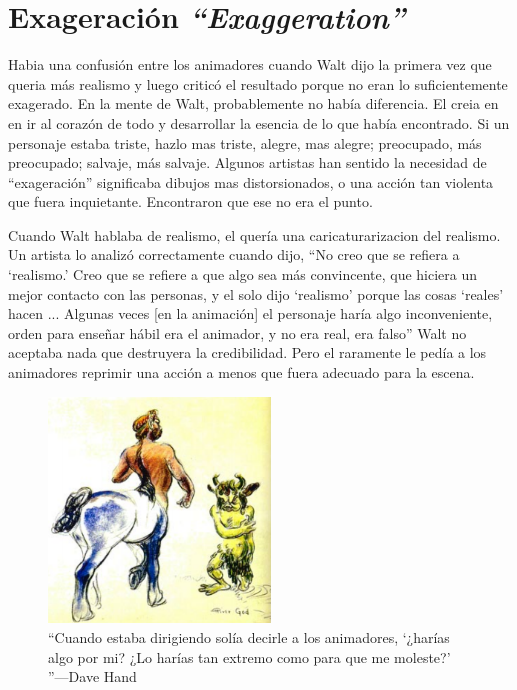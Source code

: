 \documentclass[a4paper,12pt]{report}
\begin{document}
 
 
\section{Exageración \textit{``Exaggeration''}}
 
 
Habia una confusión entre los animadores cuando Walt dijo la primera vez que queria más realismo y luego criticó el resultado porque no eran lo suficientemente exagerado.
En la mente de Walt, probablemente no había diferencia. El creia en en ir al corazón de todo y desarrollar la esencia de lo que había encontrado.
Si un personaje estaba triste, hazlo mas triste, alegre, mas alegre; preocupado, más preocupado; salvaje, más salvaje.
Algunos artistas han sentido la necesidad de ``exageración'' significaba dibujos mas distorsionados, o una acción tan violenta que fuera inquietante.
Encontraron que ese no era el punto.\cite{principles_animation}
 
 
Cuando Walt hablaba de realismo, el quería una caricaturarizacion del realismo. Un artista lo analizó correctamente cuando dijo,
``No creo que se refiera a `realismo.' Creo que se refiere a que algo sea más convincente, que hiciera un mejor contacto con las personas, y el solo
dijo `realismo' porque las cosas `reales' hacen ... Algunas veces [en la animación] el personaje haría algo inconveniente, orden
para enseñar hábil era el animador, y no era real, era falso'' Walt no aceptaba nada que destruyera la credibilidad. 
Pero el raramente le pedía a los animadores reprimir una acción a menos que fuera adecuado para la escena.\cite{principles_animation}
 
 
\begin{figure}[ht]
    \centering
    \includegraphics[height=6cm]{Imagenes/exageration}
    \caption{``Cuando estaba dirigiendo solía decirle a los animadores, `¿harías algo por mi? ¿Lo harías tan extremo como para que me moleste?' ''---Dave Hand}
    \label{fig:exageration}
\end{figure}
 
\end{document}
